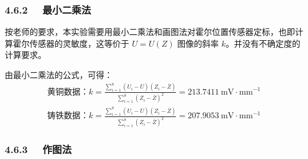 \documentclass[UTF8]{article}
\theoremstyle{MyLineTheoremStyle} %
\theoremstyle{MyBlockTheoremStyle} %
\theoremstyle{MySubsubsectionStyle} %
\begin{document}
\subsubsection*{4.6.2 \ \ 最小二乘法}

按老师的要求，本实验需要用最小二乘法和画图法对霍尔位置传感器定标，也即计算霍尔传感器的灵敏度，这等价于 $U = U(Z)$ 图像的斜率 $k$。并没有不确定度的计算要求。

由最小二乘法的公式，可得：
\begin{gather}
\text{黄铜数据：} k = 
\frac{\sum_{i=1}^{8} \left( U_i - \overline{U}\right) \left(Z_i - \overline{Z}\right) }{ \sum_{i=1}^{8}\left(Z_i - \overline{Z}\right)^2 } = 213.7411 \ \mathrm{mV \cdot mm^{-1}} \\ 
\text{铸铁数据：} k = \frac{\sum_{i=1}^{8} \left( U_i - \overline{U}\right) \left(Z_i - \overline{Z}\right) }{ \sum_{i=1}^{8}\left(Z_i - \overline{Z}\right)^2 } = 207.9053  \ \mathrm{mV \cdot mm^{-1}} 
\end{gather}

\subsubsection*{4.6.3 \ \ 作图法}
\end{document}

